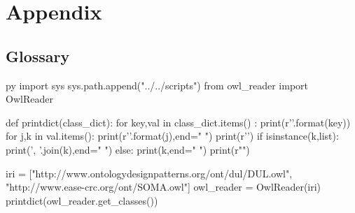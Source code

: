 \chapter{Appendix}
\label{app:complete_pub_list}
\section{Glossary}
\label{appendix:section1}

\begin{pythontexcustomcode}{py}
import sys
sys.path.append("../../scripts")
from owl_reader import OwlReader
\end{pythontexcustomcode}

\begin{pycode}

def printdict(class_dict):
	for key,val in class_dict.items() :
		print(r'\textbf{{{}}}'.format(key))
		for j,k in val.items():
			print(r'\textit{{{}}}'.format(j),end=" ")
			print(r'{\textbullet}{}')
			if isinstance(k,list):
				print(', '.join(k),end=" ")
			else:
				print(k,end=" ")
		print(r"\linebreak")
\end{pycode}


\begin{multicols}{2}

\begin{pycode}

iri = ["http://www.ontologydesignpatterns.org/ont/dul/DUL.owl", "http://www.ease-crc.org/ont/SOMA.owl"]
owl_reader = OwlReader(iri)
printdict(owl_reader.get_classes())

\end{pycode}

\end{multicols}
